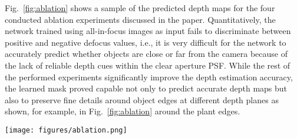 \documentclass[preprint,5p,twocolumn]{elsarticle}
\begin{document}
Fig.~\ref{fig:ablation} shows a sample of the predicted depth maps for the four conducted ablation experiments discussed in the paper. Quantitatively, the network trained using all-in-focus images as input fails to discriminate between positive and negative defocus values, i.e., it is very difficult for the network to accurately predict whether objects are close or far from the camera because of the  lack of reliable depth cues within the clear aperture PSF. While the rest of the performed experiments significantly improve the depth estimation accuracy, the learned mask proved capable not only to predict accurate depth maps but also to preserve  fine details around object edges at different depth planes as shown, for example, in Fig.~\ref{fig:ablation} around the plant edges.

\begin{figure*}[h!]
\begin{center}
\texttt{[image: figures/ablation.png]}
\end{center}
   \caption{A sample from the qualitative results for the four conducted ablation experiments on the test set of the subset of FlyingThings3D~\cite{MIFDB16}.}
\label{fig:ablation}
\end{figure*}


 
\end{document}
